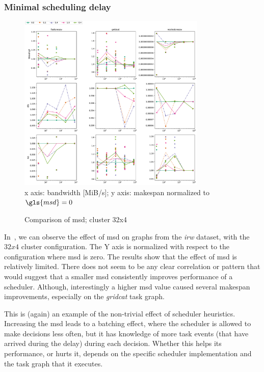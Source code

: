\subsubsection*{Minimal scheduling delay}

\begin{figure}
	\centering
	\includegraphics[width=0.8\textwidth]{imgs/estee/charts/irw-32x4-schedtime-score}\\
	{\small x axis: bandwidth [MiB/s]; y axis: makespan normalized to
	$\gls{msd}=0$}
	\caption{Comparison of \gls{msd}; cluster 32x4}
	\label{fig:estee-chart-irw-msd}
\end{figure}

In~, we can observe the effect of \gls{msd} on graphs from the
\emph{irw} dataset, with the $32x4$ cluster configuration. The Y axis
is normalized with respect to the configuration where \gls{msd} is zero. The results
show that the effect of \gls{msd} is relatively limited. There does not seem to be
any clear correlation or pattern that would suggest that a smaller \gls{msd}
consistently improves performance of a scheduler. Although, interestingly a higher
\gls{msd} value caused several makespan improvements, especially on the
\emph{gridcat} task graph.

This is (again) an example of the non-trivial effect of scheduler heuristics. Increasing the
\gls{msd} leads to a batching effect, where the scheduler is allowed to make decisions
less often, but it has knowledge of more task events (that have arrived during the delay) during
each decision. Whether this helps its performance, or hurts it, depends on the specific scheduler
implementation and the task graph that it executes.

